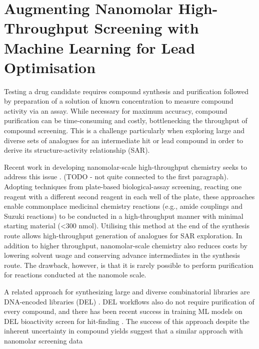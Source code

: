 \chapter{Augmenting Nanomolar High-Throughput Screening with Machine Learning for Lead Optimisation} \label{ch:testing}

Testing a drug candidate requires compound synthesis and purification followed by preparation of a solution of known concentration to measure compound activity via an assay. While necessary for maximum accuracy, compound purification can be time-consuming and costly, bottlenecking the throughput of compound screening. This is a challenge particularly when exploring large and diverse sets of analogues for an intermediate hit or lead compound in order to derive its structure-activity relationship (SAR).

Recent work in developing nanomolar-scale high-throughput chemistry seeks to address this issue \cite{Santarilla2015MerckNanomolar, Perera2018PfizerNanomolar, Gehrtz2022nanomolar}. (TODO - not quite connected to the first paragraph). Adopting techniques from plate-based biological-assay screening, reacting one reagent with a different second reagent in each well of the plate, these approaches enable commonplace medicinal chemistry reactions (e.g., amide couplings and Suzuki reactions) to be conducted in a high-throughput manner with minimal starting material (<300 nmol). Utilising this method at the end of the synthesis route allows high-throughput generation of analogues for SAR exploration. In addition to higher throughput, nanomolar-scale chemistry also reduces costs by lowering solvent usage and conserving advance intermediates in the synthesis route. The drawback, however, is that it is rarely possible to perform purification for reactions conducted at the nanomole scale. 

A related approach for synthesizing large and diverse combinatorial libraries are DNA-encoded libraries (DEL) \cite{GirondaMartinez2021DNALibrary}. DEL workflows also do not require purification of every compound, and there has been recent success in training ML models on DEL bioactivity screen for hit-finding \cite{McCloskey2020DNALibrary}. The success of this approach despite the inherent uncertainty in compound yields suggest that a similar approach with nanomolar screening data 


